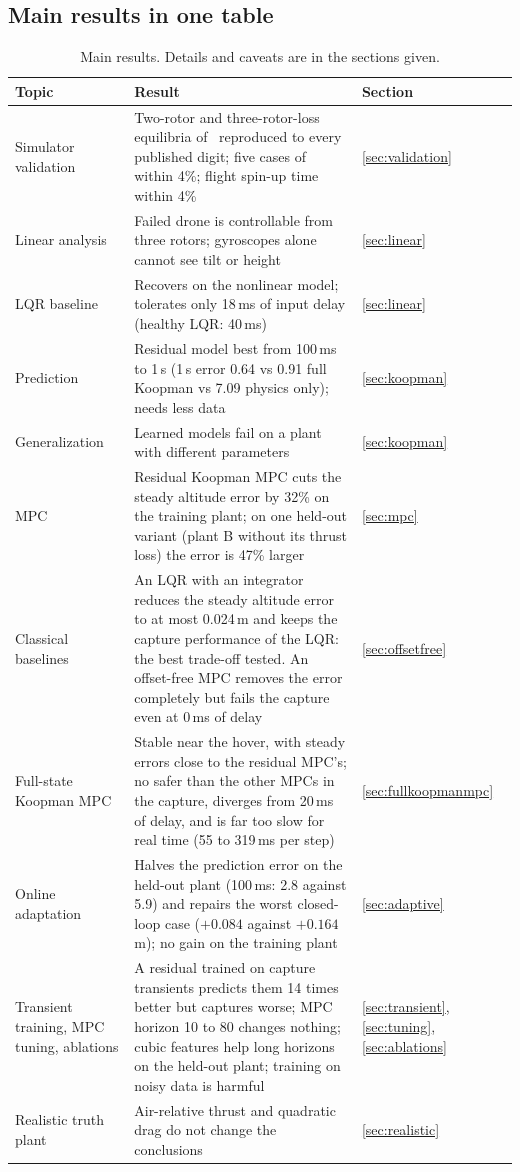 \subsection{Main results in one table}
\begin{small}
\begin{longtable}{p{2.9cm}p{9.0cm}p{2.3cm}}
\caption{Main results. Details and caveats are in the sections given.}\label{tab:main}\\
\toprule
Topic & Result & Section \\
\midrule
\endhead
Simulator validation & Two-rotor and three-rotor-loss equilibria of~\cite{mueller2014stability} reproduced to every published digit; five cases of~\cite{mueller2016relaxed} within 4\%; flight spin-up time within 4\% & \ref{sec:validation} \\
Linear analysis & Failed drone is controllable from three rotors; gyroscopes alone cannot see tilt or height & \ref{sec:linear} \\
LQR baseline & Recovers on the nonlinear model; tolerates only 18\,ms of input delay (healthy LQR: 40\,ms) & \ref{sec:linear} \\
Prediction & Residual model best from 100\,ms to 1\,s (1\,s error 0.64 vs 0.91 full Koopman vs 7.09 physics only); needs less data & \ref{sec:koopman} \\
Generalization & Learned models fail on a plant with different parameters & \ref{sec:koopman} \\
MPC & Residual Koopman MPC cuts the steady altitude error by 32\% on the training plant; on one held-out variant (plant B without its thrust loss) the error is 47\% larger & \ref{sec:mpc} \\
Classical baselines & An LQR with an integrator reduces the steady altitude error to at most 0.024\,m and keeps the capture performance of the LQR: the best trade-off tested. An offset-free MPC removes the error completely but fails the capture even at 0\,ms of delay & \ref{sec:offsetfree} \\
Full-state Koopman MPC & Stable near the hover, with steady errors close to the residual MPC's; no safer than the other MPCs in the capture, diverges from 20\,ms of delay, and is far too slow for real time (55 to 319\,ms per step) & \ref{sec:fullkoopmanmpc} \\
Online adaptation & Halves the prediction error on the held-out plant (100\,ms: 2.8 against 5.9) and repairs the worst closed-loop case ($+0.084$ against $+0.164$\,m); no gain on the training plant & \ref{sec:adaptive} \\
Transient training, MPC tuning, ablations & A residual trained on capture transients predicts them 14 times better but captures worse; MPC horizon 10 to 80 changes nothing; cubic features help long horizons on the held-out plant; training on noisy data is harmful & \ref{sec:transient}, \ref{sec:tuning}, \ref{sec:ablations} \\
Realistic truth plant & Air-relative thrust and quadratic drag do not change the conclusions & \ref{sec:realistic} \\
\bottomrule
\end{longtable}
\end{small}
